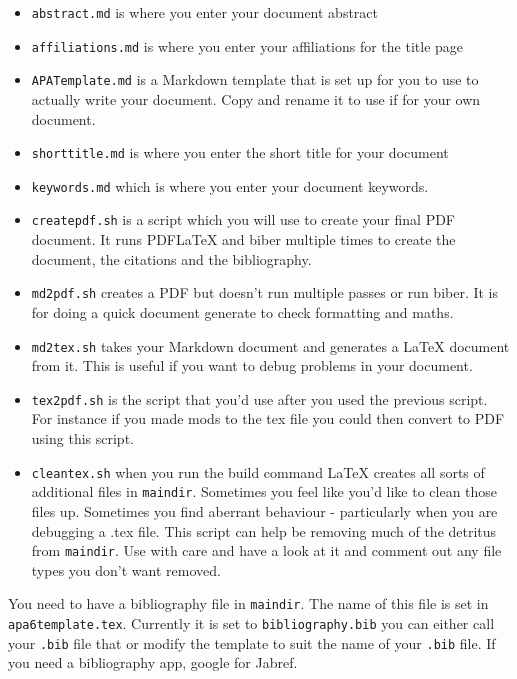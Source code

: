 \documentclass{easychair}
\begin{document}
\begin{itemize}
\itemsep1pt\parskip0pt
\item
  \texttt{abstract.md} is where you enter your document abstract
\item
  \texttt{affiliations.md} is where you enter your affiliations for the
  title page
\item
  \texttt{APATemplate.md} is a Markdown template that is set up for you
  to use to actually write your document. Copy and rename it to use if
  for your own document.
\item
  \texttt{shorttitle.md} is where you enter the short title for your
  document
\item
  \texttt{keywords.md} which is where you enter your document keywords.
\item
  \texttt{createpdf.sh} is a script which you will use to create your
  final PDF document. It runs PDFLaTeX and biber multiple times to
  create the document, the citations and the bibliography.
\item
  \texttt{md2pdf.sh} creates a PDF but doesn't run multiple passes or
  run biber. It is for doing a quick document generate to check
  formatting and maths.
\item
  \texttt{md2tex.sh} takes your Markdown document and generates a LaTeX
  document from it. This is useful if you want to debug problems in your
  document.
\item
  \texttt{tex2pdf.sh} is the script that you'd use after you used the
  previous script. For instance if you made mods to the tex file you
  could then convert to PDF using this script.
\item
  \texttt{cleantex.sh} when you run the build command LaTeX creates all
  sorts of additional files in \texttt{maindir}. Sometimes you feel like
  you'd like to clean those files up. Sometimes you find aberrant
  behaviour - particularly when you are debugging a .tex file. This
  script can help be removing much of the detritus from
  \texttt{maindir}. Use with care and have a look at it and comment out
  any file types you don't want removed.
\end{itemize}

You need to have a bibliography file in \texttt{maindir}. The name of
this file is set in \texttt{apa6template.tex}. Currently it is set to
\texttt{bibliography.bib} you can either call your \texttt{.bib} file
that or modify the template to suit the name of your \texttt{.bib} file.
If you need a bibliography app, google for Jabref.
\end{document}

